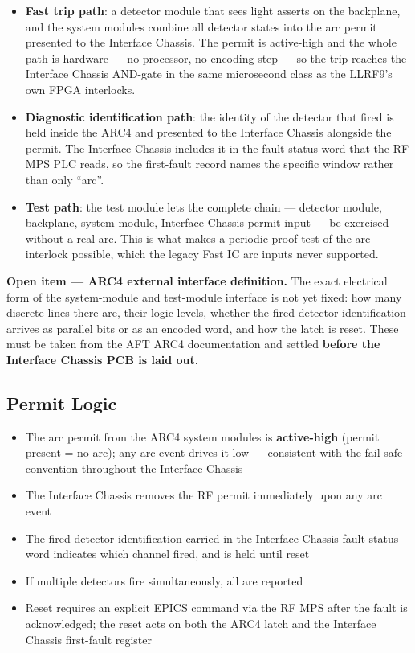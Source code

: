 \begin{itemize}
\tightlist
\item
  \textbf{Fast trip path}: a detector module that sees light asserts on the backplane, and the system modules combine all detector states into the arc permit presented to the Interface Chassis. The permit is active-high and the whole path is hardware --- no processor, no encoding step --- so the trip reaches the Interface Chassis AND-gate in the same microsecond class as the LLRF9's own FPGA interlocks.
\item
  \textbf{Diagnostic identification path}: the identity of the detector that fired is held inside the ARC4 and presented to the Interface Chassis alongside the permit. The Interface Chassis includes it in the fault status word that the RF MPS PLC reads, so the first-fault record names the specific window rather than only ``arc''.
\item
  \textbf{Test path}: the test module lets the complete chain --- detector module, backplane, system module, Interface Chassis permit input --- be exercised without a real arc. This is what makes a periodic proof test of the arc interlock possible, which the legacy Fast IC arc inputs never supported.
\end{itemize}

\begin{keynote}
\textbf{Open item --- ARC4 external interface definition.} The exact electrical
form of the system-module and test-module interface is not yet fixed: how many
discrete lines there are, their logic levels, whether the fired-detector
identification arrives as parallel bits or as an encoded word, and how the latch
is reset. These must be taken from the AFT ARC4 documentation and settled
\textbf{before the Interface Chassis PCB is laid out}.
\end{keynote}

\subsection{Permit Logic}\label{arc-permit-logic}

\begin{itemize}
\tightlist
\item
  The arc permit from the ARC4 system modules is \textbf{active-high} (permit present = no arc); any arc event drives it low --- consistent with the fail-safe convention throughout the Interface Chassis
\item
  The Interface Chassis removes the RF permit immediately upon any arc event
\item
  The fired-detector identification carried in the Interface Chassis fault status word indicates which channel fired, and is held until reset
\item
  If multiple detectors fire simultaneously, all are reported
\item
  Reset requires an explicit EPICS command via the RF MPS after the fault is acknowledged; the reset acts on both the ARC4 latch and the Interface Chassis first-fault register
\end{itemize}

